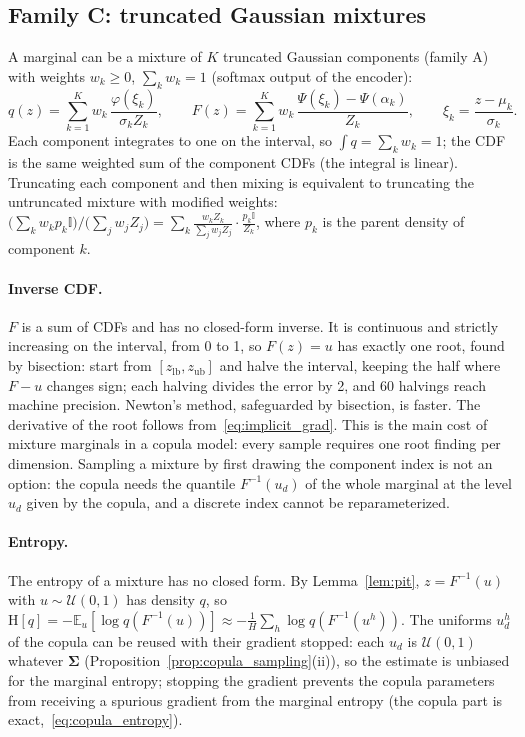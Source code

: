 \documentclass[11pt,a4paper]{article}
\numberwithin{equation}{section}
\theoremstyle{plain}
\theoremstyle{definition}
\theoremstyle{remark}
\newcommand{\Sig}{\bm{\Sigma}}
\newcommand{\E}{\mathbb{E}}
\newcommand{\Hent}{\mathrm{H}}
\newcommand{\U}{\mathcal{U}}
\newcommand{\zlb}{z_{\text{lb}}}
\newcommand{\zub}{z_{\text{ub}}}
\newcommand{\ind}{\mathbb{I}}
\begin{document}
\subsection{Family C: truncated Gaussian mixtures}
\label{sec:gm}
A marginal can be a mixture of $K$ truncated Gaussian components (family A) with weights $w_k\ge0$, $\sum_kw_k=1$ (softmax output of the encoder):
\begin{equation}
q(z)=\sum_{k=1}^Kw_k\,\frac{\varphi(\xi_k)}{\sigma_kZ_k},\qquad
F(z)=\sum_{k=1}^Kw_k\,\frac{\Psi(\xi_k)-\Psi(\alpha_k)}{Z_k},\qquad\xi_k=\frac{z-\mu_k}{\sigma_k}.
\end{equation}
Each component integrates to one on the interval, so $\int q=\sum_kw_k=1$; the CDF is the same weighted sum of the component CDFs (the integral is linear).
Truncating each component and then mixing is equivalent to truncating the untruncated mixture with modified weights: $\big(\sum_kw_kp_k\ind\big)/\big(\sum_jw_jZ_j\big)=\sum_k\frac{w_kZ_k}{\sum_jw_jZ_j}\cdot\frac{p_k\ind}{Z_k}$, where $p_k$ is the parent density of component $k$.

\paragraph{Inverse CDF.} $F$ is a sum of CDFs and has no closed-form inverse. It is continuous and strictly increasing on the interval, from 0 to 1, so $F(z)=u$ has exactly one root, found by bisection: start from $[\zlb,\zub]$ and halve the interval, keeping the half where $F-u$ changes sign; each halving divides the error by 2, and 60 halvings reach machine precision. Newton's method, safeguarded by bisection, is faster. The derivative of the root follows from~\eqref{eq:implicit_grad}.
This is the main cost of mixture marginals in a copula model: every sample requires one root finding per dimension. Sampling a mixture by first drawing the component index is not an option: the copula needs the quantile $F^{-1}(u_d)$ of the whole marginal at the level $u_d$ given by the copula, and a discrete index cannot be reparameterized.

\paragraph{Entropy.} The entropy of a mixture has no closed form. By Lemma~\ref{lem:pit}, $z=F^{-1}(u)$ with $u\sim\U(0,1)$ has density $q$, so $\Hent[q]=-\E_{u}[\log q(F^{-1}(u))]\approx-\frac1H\sum_h\log q(F^{-1}(u^h))$. The uniforms $u_d^h$ of the copula can be reused with their gradient stopped: each $u_d$ is $\U(0,1)$ whatever $\Sig$ (Proposition~\ref{prop:copula_sampling}(ii)), so the estimate is unbiased for the marginal entropy; stopping the gradient prevents the copula parameters from receiving a spurious gradient from the marginal entropy (the copula part is exact,~\eqref{eq:copula_entropy}).
\end{document}
